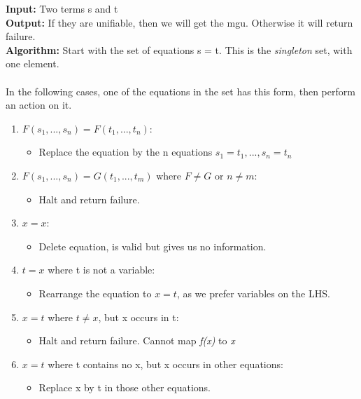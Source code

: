 \documentclass[a4paper,10pt]{article}
\begin{document}
\textbf{Input:} Two terms s and t \\
\textbf{Output:} If they are unifiable, then we will get the mgu. Otherwise it will return failure. \\
\textbf{Algorithm:} Start with the set of equations {s = t}. This is the \emph{singleton} set, with one element. \\ \\
In the following cases, one of the equations in the set has this form, then perform an action on it. \\
\begin{enumerate}
\item $F(s_{1}, ... ,s_{n}) = F(t_{1}, ... ,t_{n})$: 
\renewcommand{\labelitemi}{\textperiodcentered}
	\begin{itemize}
	\item Replace the equation by the n equations $s_{1} = t_{1}, ... , s_{n} = t_{n}$
	\end{itemize}
\item  $F(s_{1}, ... ,s_{n}) = G(t_{1}, ... ,t_{m})$ where $F \neq G$ or $n \neq m$:
\renewcommand{\labelitemi}{\textperiodcentered}
	\begin{itemize}
	\item Halt and return failure. 
	\end{itemize}
\item $x = x$:
\renewcommand{\labelitemi}{\textperiodcentered}
	\begin{itemize}
	\item Delete equation, is valid but gives us no information. 
	\end{itemize}
\item $t = x$ where t is not a variable:
\renewcommand{\labelitemi}{\textperiodcentered}
	\begin{itemize}
	\item Rearrange the equation to $x = t$, as we prefer variables on the LHS.
	\end{itemize}
\item $x = t$ where $t \neq x$, but x occurs in t: 
\renewcommand{\labelitemi}{\textperiodcentered}
	\begin{itemize}
	\item Halt and return failure. Cannot map \emph{f(x)} to \emph{x}
	\end{itemize}
\item $x = t$ where t contains no x, but x occurs in other equations: 
\renewcommand{\labelitemi}{\textperiodcentered}
	\begin{itemize}
	\item Replace x by t in those other equations. 
	\end{itemize}
\end{enumerate}
\end{document}
